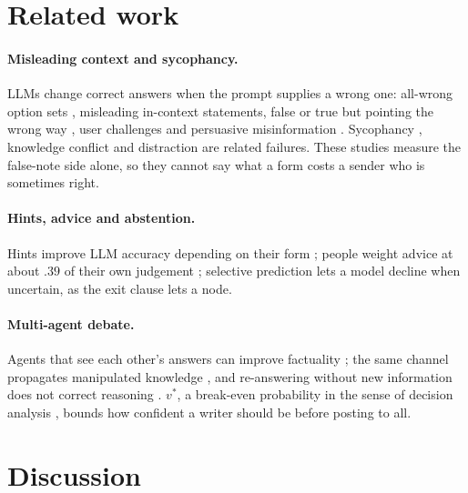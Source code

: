 \documentclass[11pt]{article}
\begin{document}
\section{Related work}

\paragraph{Misleading context and sycophancy.} LLMs change correct answers when the prompt supplies a wrong one: all-wrong option sets \citep{goral2025wait}, misleading in-context statements, false \citep{wang2026misleadqa} or true but pointing the wrong way \citep{shafiei2026truthtrap}, user challenges \citep{wang2023defend} and persuasive misinformation \citep{xu2024earth}. Sycophancy \citep{sharma2024sycophancy,wei2023synthetic}, knowledge conflict \citep{xie2024chameleon,xu2024conflicts} and distraction \citep{shi2023distracted} are related failures. These studies measure the false-note side alone, so they cannot say what a form costs a sender who is sometimes right.

\paragraph{Hints, advice and abstention.} Hints improve LLM accuracy depending on their form \citep{marioriyad2025unspoken}; people weight advice at about $.39$ of their own judgement \citep{bailey2023advice}; selective prediction \citep{kamath2020selective} lets a model decline when uncertain, as the exit clause lets a node.

\paragraph{Multi-agent debate.} Agents that see each other's answers can improve factuality \citep{du2024debate}; the same channel propagates manipulated knowledge \citep{ju2024flooding}, and re-answering without new information does not correct reasoning \citep{huang2024selfcorrect}. $v^\ast$, a break-even probability in the sense of decision analysis \citep{howard1966}, bounds how confident a writer should be before posting to all.

\section{Discussion}
\end{document}
